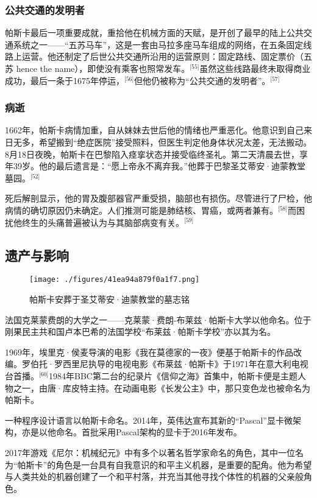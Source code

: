 \subsubsection{公共交通的发明者}
帕斯卡最后一项重要成就，重拾他在机械方面的天赋，是开创了最早的陆上公共交通系统之一——“五苏马车”，这是一套由马拉多座马车组成的网络，在五条固定线路上运营。他还制定了后世公共交通所沿用的运营原则：固定路线、固定票价（五苏 hence the name），即使没有乘客也照常发车。\(^\text{[55]}\)虽然这些线路最终未取得商业成功，最后一条于1675年停运，\(^\text{[56]}\)但他仍被称为“公共交通的发明者”。\(^\text{[57]}\)
\subsubsection{病逝}
1662年，帕斯卡病情加重，自从妹妹去世后他的情绪也严重恶化。他意识到自己来日无多，希望搬到“绝症医院”接受照料，但医生判定他身体状况太差，无法搬动。8月18日夜晚，帕斯卡在巴黎陷入痉挛状态并接受临终圣礼。第二天清晨去世，享年39岁。他的最后遗言是：“愿上帝永不离弃我。”他葬于巴黎圣艾蒂安·迪蒙教堂墓园。\(^\text{[52]}\)

死后解剖显示，他的胃及腹部器官严重受损，脑部也有损伤。尽管进行了尸检，他病情的确切原因仍未确定。人们推测可能是肺结核、胃癌，或两者兼有。\(^\text{[58]}\)而困扰他终生的头痛普遍被认为与其脑部病变有关。\(^\text{[59]}\)
\subsection{遗产与影响}
\begin{figure}[ht]
\centering
\texttt{[image: ./figures/41ea94a879f0a1f7.png]}
\caption{帕斯卡安葬于圣艾蒂安·迪蒙教堂的墓志铭} \label{fig_BLSpsk_12}
\end{figure}
法国克莱蒙费朗的大学之一——克莱蒙·费朗-布莱兹·帕斯卡大学以他命名。位于刚果民主共和国卢本巴希的法国学校“布莱兹·帕斯卡学校”亦以其为名。

1969年，埃里克·侯麦导演的电影《我在莫德家的一夜》便基于帕斯卡的作品改编。罗伯托·罗西里尼执导的电视电影《布莱兹·帕斯卡》于1971年在意大利电视台首播。\(^\text{[60]}\)1984年BBC第二台的纪录片《信仰之海》首集中，帕斯卡便是主题人物之一，由唐·库皮特主持。在动画电影《长发公主》中，那只变色龙也被命名为帕斯卡。

一种程序设计语言以帕斯卡命名。2014年，英伟达宣布其新的“Pascal”显卡微架构，亦是以他命名。首批采用Pascal架构的显卡于2016年发布。

2017年游戏《尼尔：机械纪元》中有多个以著名哲学家命名的角色，其中一位名为“帕斯卡”的角色是一台具有自我意识的和平主义机器，是重要的配角。他为希望与人类共处的机器创建了一个和平村落，并充当其他寻找个体性的机器的父亲般角色。

